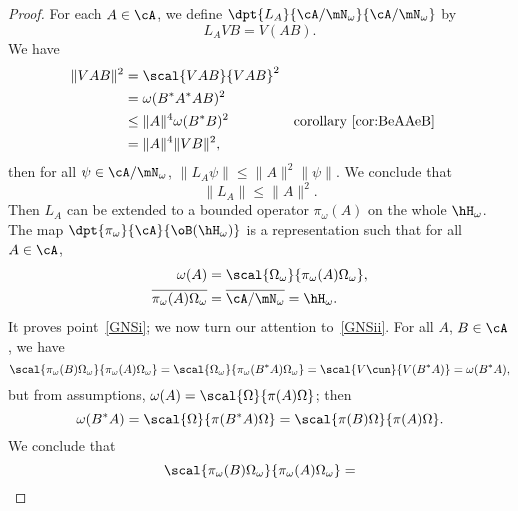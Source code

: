 \begin{proof}
	For each $A\in\cA$, we define $\dpt{L_A}{\cA/\mN_{\omega}}{\cA/\mN_{\omega}}$ by
	\begin{equation}  \label{eq:defpiomega}
		L_AVB=V(AB).
	\end{equation}
	We have
	\begin{equation}
		\begin{aligned}
			\| VAB \|^2 & =\scal{VAB}{VAB}^2                                                    \\
			            & =\omega(B^*A^*AB)^2                                                   \\
			            & \leq \| A \|^4\omega(B^*B)^2 &  & \textrm{corollary~\ref{cor:BeAAeB}} \\
			            & =\| A \|^4\| VB \|^2,
		\end{aligned}
	\end{equation}
	then for all $\psi\in\cA/\mN_{\omega}$, $\| L_A\psi \|\leq \| A \|^2\| \psi \|$. We conclude that
	\begin{equation}
		\| L_A \|\leq \| A \|^2.
	\end{equation}
	Then $L_A$ can be extended to a bounded operator $\pi_{\omega}(A)$ on the whole $\hH_{\omega}$. The map $\dpt{\pi_{\omega}}{\cA}{\oB(\hH_{\omega})}$ is a representation such that for all $A\in\cA$,
	\begin{subequations}
		\begin{align}
			\omega(A)                                   & =\scal{\Omega_{\omega}}{\pi_{\omega}(A)\Omega_{\omega}}, \\
			\overline{ \pi_{\omega}(A)\Omega_{\omega} } & =\overline{ \cA/\mN_{\omega} }=\hH_{\omega}.
		\end{align}
	\end{subequations}
	It proves point~\ref{GNSi}; we now turn our attention to~\ref{GNSii}. For all $A$, $B\in\cA$, we have
	\begin{equation}  \label{eq_r1903r4}
		\scal{\pi_{\omega}(B)\Omega_{\omega}}{\pi_{\omega}(A)\Omega_{\omega}}=\scal{\Omega_{\omega}}{\pi_{\omega}(B^*A)\Omega_{\omega}}
		=\scal{V\cun}{V(B^*A)}
		=\omega(B^*A),
	\end{equation}
	but from assumptions, $\omega(A)=\scal{\Omega}{\pi(A)\Omega}$; then
	\begin{equation} \label{eq:BesAOmBeA}
		\omega(B^*A)=\scal{\Omega}{\pi(B^*A)\Omega}
		=\scal{\pi(B)\Omega}{\pi(A)\Omega}.
	\end{equation}
	We conclude that
	\begin{equation}
		\scal{\pi_{\omega}(B)\Omega_{\omega}}{\pi_{\omega}(A)\Omega_{\omega}}=

\end{equation}
\end{proof}

